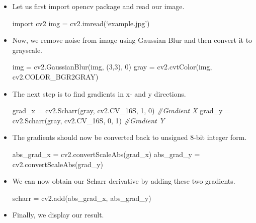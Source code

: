 \documentclass[]{article}
\newenvironment{Shaded}{}{}
\newcommand{\DecValTok}[1]{\textcolor[rgb]{0.25,0.63,0.44}{{#1}}}
\newcommand{\ImportTok}[1]{{#1}}
\newcommand{\CommentTok}[1]{\textcolor[rgb]{0.38,0.63,0.69}{\textit{{#1}}}}
\newcommand{\OperatorTok}[1]{\textcolor[rgb]{0.40,0.40,0.40}{{#1}}}
\newcommand{\NormalTok}[1]{{#1}}
\begin{document}
\begin{itemize}
\item
  Let us first import opencv package and read our image.

\begin{Shaded}
\begin{Highlighting}[]
\ImportTok{import} \NormalTok{cv2}
\NormalTok{img }\OperatorTok{=} \NormalTok{cv2.imread(‘example.jpg’)}
\end{Highlighting}
\end{Shaded}
\item
  Now, we remove noise from image using Gaussian Blur and then convert
  it to grayscale.

\begin{Shaded}
\begin{Highlighting}[]
\NormalTok{img }\OperatorTok{=} \NormalTok{cv2.GaussianBlur(img, (}\DecValTok{3}\NormalTok{,}\DecValTok{3}\NormalTok{), }\DecValTok{0}\NormalTok{)}
\NormalTok{gray }\OperatorTok{=} \NormalTok{cv2.cvtColor(img, cv2.COLOR_BGR2GRAY)}
\end{Highlighting}
\end{Shaded}
\item
  The next step is to find gradients in x- and y directions.

\begin{Shaded}
\begin{Highlighting}[]
\NormalTok{grad_x }\OperatorTok{=} \NormalTok{cv2.Scharr(gray, cv2.CV_16S, }\DecValTok{1}\NormalTok{, }\DecValTok{0}\NormalTok{) }\CommentTok{#Gradient X}
\NormalTok{grad_y }\OperatorTok{=} \NormalTok{cv2.Scharr(gray, cv2.CV_16S, }\DecValTok{0}\NormalTok{, }\DecValTok{1}\NormalTok{) }\CommentTok{#Gradient Y}
\end{Highlighting}
\end{Shaded}
\item
  The gradients should now be converted back to unsigned 8-bit integer
  form.

\begin{Shaded}
\begin{Highlighting}[]
\NormalTok{abs_grad_x }\OperatorTok{=} \NormalTok{cv2.convertScaleAbs(grad_x)}
\NormalTok{abs_grad_y }\OperatorTok{=} \NormalTok{cv2.convertScaleAbs(grad_y)}
\end{Highlighting}
\end{Shaded}
\item
  We can now obtain our Scharr derivative by adding these two gradients.

\begin{Shaded}
\begin{Highlighting}[]
\NormalTok{scharr }\OperatorTok{=} \NormalTok{cv2.add(abs_grad_x, abs_grad_y)}
\end{Highlighting}
\end{Shaded}
\item
  Finally, we display our result.


\end{itemize}
\end{document}
